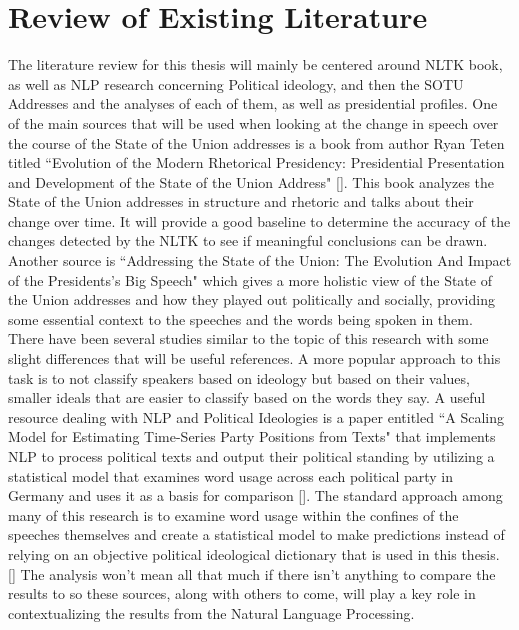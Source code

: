 \documentclass[reqno,12pt,oneside,letter]{report}
\begin{document}
\section*{Review of Existing Literature}
The literature review for this thesis will mainly be centered around NLTK book, as well as NLP research concerning Political ideology, and then the SOTU Addresses and the analyses of each of them, as well as presidential profiles.
One of the main sources that will be used when looking at the change in speech over the course of the State of the Union addresses is a book from author Ryan Teten titled ``Evolution of the Modern Rhetorical Presidency: Presidential Presentation and Development of the State of the Union Address" [\cite{teten03}].
This book analyzes the State of the Union addresses in structure and rhetoric and talks about their change over time.
It will provide a good baseline to determine the accuracy of the changes detected by the NLTK to see if meaningful conclusions can be drawn.
Another source is ``Addressing the State of the Union: The Evolution And Impact of the Presidents's Big Speech" which gives a more holistic view of the State of the Union addresses and how they played out politically and socially, providing some essential context to the speeches and the words being spoken in them.
There have been several studies similar to the topic of this research with some slight differences that will be useful references.
A more popular approach to this task is to not classify speakers based on ideology but based on their values, smaller ideals that are easier to classify based on the words they say.
A useful resource dealing with NLP and Political Ideologies is a paper entitled ``A Scaling Model for Estimating Time-Series Party Positions from Texts" that implements NLP to process political texts and output their political standing by utilizing a statistical model that examines word usage across each political party in Germany and uses it as a basis for comparison [\cite{slapin08}].
The standard approach among many of this research is to examine word usage within the confines of the speeches themselves and create a statistical model to make predictions instead of relying on an objective political ideological dictionary that is used in this thesis. [\cite{sim13}]
The analysis won't mean all that much if there isn't anything to compare the results to so these sources, along with others to come, will play a key role in contextualizing the results from the Natural Language Processing.
\end{document}
